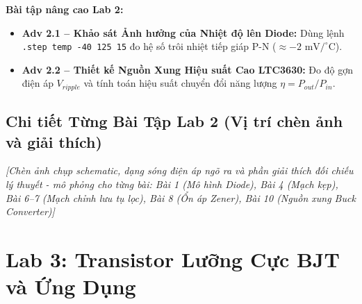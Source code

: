 \documentclass[12pt,a4paper]{report}
\begin{document}
\textbf{Bài tập nâng cao Lab 2:}
\begin{itemize}[noitemsep]
    \item \textbf{Adv 2.1 -- Khảo sát Ảnh hưởng của Nhiệt độ lên Diode:} Dùng lệnh \lstinline|.step temp -40 125 15| đo hệ số trôi nhiệt tiếp giáp P-N ($\approx -2\text{ mV}/^\circ\text{C}$).
    \item \textbf{Adv 2.2 -- Thiết kế Nguồn Xung Hiệu suất Cao LTC3630:} Đo độ gợn điện áp $V_{ripple}$ và tính toán hiệu suất chuyển đổi năng lượng $\eta = P_{out}/P_{in}$.
\end{itemize}

\begin{orangebox}
\centering
\vspace{0.3cm}
\vspace{0.3cm}
\end{orangebox}

\subsection*{Chi tiết Từng Bài Tập Lab 2 (Vị trí chèn ảnh và giải thích)}
\begin{orangebox}
\textit{\color{guidegray}[Chèn ảnh chụp schematic, dạng sóng điện áp ngõ ra và phần giải thích đối chiếu lý thuyết - mô phỏng cho từng bài: Bài 1 (Mô hình Diode), Bài 4 (Mạch kẹp), Bài 6--7 (Mạch chỉnh lưu tụ lọc), Bài 8 (Ổn áp Zener), Bài 10 (Nguồn xung Buck Converter)]}
\end{orangebox}

\section{Lab 3: Transistor Lưỡng Cực BJT và Ứng Dụng}
\end{document}
